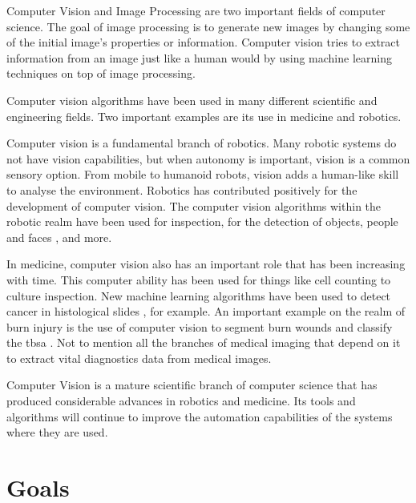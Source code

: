 Computer Vision and Image Processing are two important fields of computer science. The goal of image processing is to generate new images by changing some of the initial image's properties or information. Computer vision tries to extract information from an image just like a human would by using machine learning techniques on top of image processing.

Computer vision algorithms have been used in many different scientific and engineering fields. Two important examples are its use in medicine and robotics.

Computer vision is a fundamental branch of robotics. Many robotic systems do not have vision capabilities, but when autonomy is important, vision is a common sensory option. From mobile to humanoid robots, vision adds a human-like skill to analyse the environment. Robotics has contributed positively for the development of computer vision. The computer vision algorithms within the robotic realm have been used for inspection, for the detection of objects, people and faces \cite{Fang2018_facial_detection}, and more.

In medicine, computer vision also has an important role that has been increasing with time. This computer ability has been used for things like cell counting \cite{He2019_cell_counting} to culture inspection. New machine learning algorithms have been used to detect cancer in histological slides \cite{Araujo2017_classification_breast_cancer_histology}, for example. An important example on the realm of burn injury is the use of computer vision to segment burn wounds and classify the \gls{tbsa} \cite{Wantanajittikul2012_automatic_segmentation_degree_identification_burn_wounds}. Not to mention all the branches of medical imaging that depend on it to extract vital diagnostics data from medical images.

Computer Vision is a mature scientific branch of computer science that has produced considerable advances in robotics and medicine. Its tools and algorithms will continue to improve the automation capabilities of the systems where they are used.



\section{Goals} %
\label{sec:goals}

